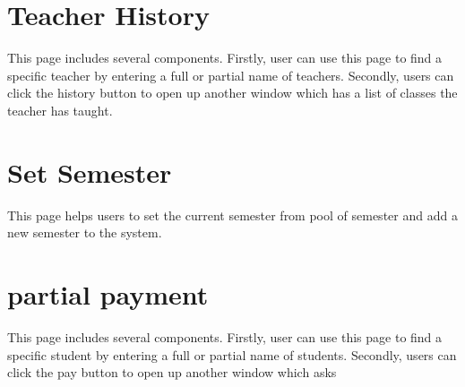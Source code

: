 \documentclass{article}
\begin{document}
\section{Teacher History}
This page includes several components. Firstly, user can use this page to find a specific teacher by entering a full or partial name of teachers. Secondly, users can click the history button to open up another window which has a list of classes the teacher has taught.
\section{Set Semester}
This page helps users to set the current semester from pool of semester and add a new semester to the system.
\section{partial payment}
This page includes several components. Firstly, user can use this page to find a specific student by entering a full or partial name of students. Secondly, users can click the pay button to open up another window which asks 
\end{document}
